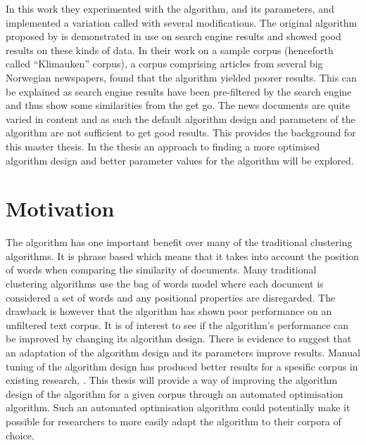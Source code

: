 In this work they experimented with the \STC algorithm, and its parameters, and implemented a variation called \CTC with several modifications. The original \STC algorithm proposed by \textcite{Oren1998} is demonstrated in use on search engine results and showed good results on these kinds of data. In their work on a sample corpus (henceforth called ``Klimauken'' corpus), a corpus comprising articles from several big Norwegian newspapers, \cite{Moe2013compact} found that the \STC algorithm yielded poorer results. This can be explained as search engine results have been pre-filtered by the search engine and thus show some similarities from the get go. The news documents are quite varied in content and as such the default algorithm design and parameters of the \STC algorithm are not sufficient to get good results. This provides the background for this master thesis. In the thesis an approach to finding a more optimised algorithm design and better parameter values for the \CTC algorithm will be explored.


\section{Motivation}

The \STC algorithm has one important benefit over many of the traditional clustering algorithms. It is phrase based which means that it takes into account the position of words when comparing the similarity of documents. Many traditional clustering algorithms use the bag of words model where each document is considered a set of words and any positional properties are disregarded. The drawback is however that the \STC algorithm has shown poor performance on an unfiltered text corpus. It is of interest to see if the algorithm's performance can be improved by changing its algorithm design. There is evidence to suggest that an adaptation of the algorithm design and its parameters improve results. Manual tuning of the algorithm design has produced better results for a spesific corpus in existing research, \parencite{Moe2014,Moe2013compact}. This thesis will provide a way of improving the algorithm design of the \CTC algorithm for a given corpus through an automated optimisation algorithm. Such an automated optimisation algorithm could potentially make it possible for researchers to more easily adapt the \CTC algorithm to their corpora of choice.

